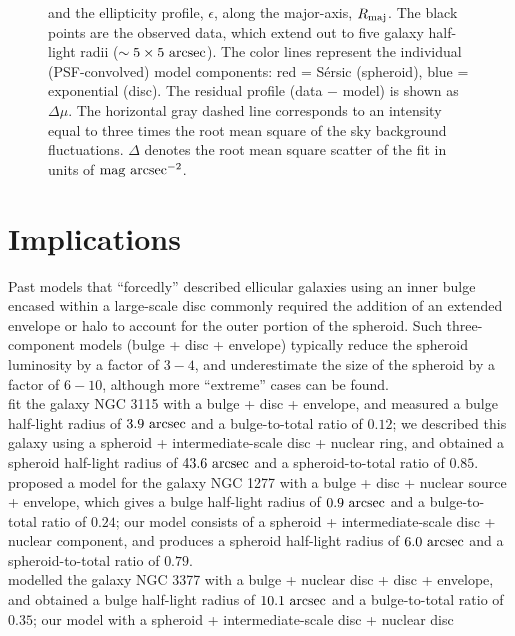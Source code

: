 \documentclass[useAMS,usenatbib,article]{mn2e}
\begin{document}
\begin{figure}
\begin{center}
{and the ellipticity profile, $\epsilon$, 
along the major-axis, $R_{\rm maj}$. 
The black points are the observed data, which extend out to five galaxy half-light radii ($\sim 5 \times 5~\rm arcsec$).
The color lines represent the individual (PSF-convolved) model components: 
red = S\'ersic (spheroid), blue = exponential (disc). 
The residual profile (data $-$ model) is shown as $\Delta \mu$. 
The horizontal gray dashed line corresponds to an intensity equal to three times the root mean square of the sky background fluctuations. 
$\Delta$ denotes the root mean square scatter of the fit in units of $\rm mag~arcsec^{-2}$.
}
\label{fig:m1216}
\end{center}
\end{figure}



\section{Implications}
\label{sec:impl}
Past models that ``forcedly'' described ellicular galaxies using an inner bulge 
encased within a large-scale disc 
commonly required the addition of an extended envelope or halo to account for the outer portion of the spheroid. 
Such three-component models (bulge + disc + envelope) typically reduce the spheroid luminosity by a factor of $3-4$, 
and underestimate the size of the spheroid by a factor of $6-10$, 
although more ``extreme'' cases can be found. \\
\cite{lasker2014data} fit the galaxy NGC 3115 with a bulge + disc + envelope, 
and measured a bulge half-light radius of $3.9~\rm arcsec$ and a bulge-to-total ratio of $0.12$; 
we described this galaxy using a spheroid + intermediate-scale disc + nuclear ring, 
and obtained a spheroid half-light radius of $43.6~\rm arcsec$ and a spheroid-to-total ratio of $0.85$. \\
\cite{vandenbosch2012} proposed a model for the galaxy NGC 1277 with a bulge + disc + nuclear source + envelope, 
which gives a bulge half-light radius of $0.9~\rm arcsec$ and a bulge-to-total ratio of $0.24$; 
our model consists of a spheroid + intermediate-scale disc + nuclear component, 
and produces a spheroid half-light radius of $6.0~\rm arcsec$ and a spheroid-to-total ratio of $0.79$. \\
\cite{lasker2014data} modelled the galaxy NGC 3377 with a bulge + nuclear disc + disc + envelope, 
and obtained a bulge half-light radius of $10.1~\rm arcsec$ and a bulge-to-total ratio of $0.35$; 
our model with a spheroid + intermediate-scale disc + nuclear disc 
\end{document}
